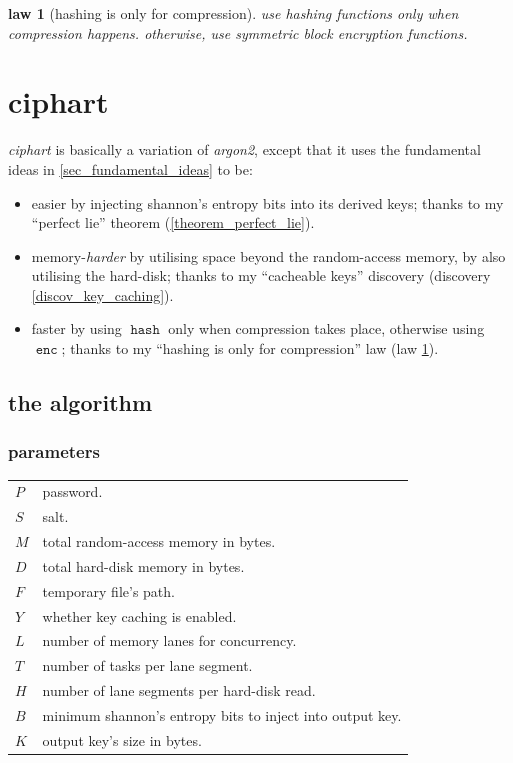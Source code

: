 \documentclass[twocolumn]{article}
\newtheorem{law}{law}[section]
\DeclareMathOperator{\enc}{\mathtt{enc}}
\DeclareMathOperator{\hash}{\mathtt{hash}}
\begin{document}
\begin{law}[hashing is only for compression]\label{law_simplification}
    use hashing functions only when compression happens.  otherwise, use
    symmetric block encryption functions.
\end{law}

\section{ciphart}
\emph{ciphart} is basically a variation of \emph{argon2}, except that it
uses the fundamental ideas in \cref{sec_fundamental_ideas} to be:
\begin{itemize}
    \item easier by injecting shannon's entropy bits into its derived keys;
    thanks to my ``perfect lie'' theorem (\cref{theorem_perfect_lie}).

    \item memory-\emph{harder} by utilising space beyond the random-access
    memory, by also utilising the hard-disk; thanks to my ``cacheable
    keys'' discovery (discovery \ref{discov_key_caching}).

    \item faster by using $\hash$ only when compression takes place,
    otherwise using $\enc$; thanks to my ``hashing is only for
    compression'' law (law \ref{law_simplification}).
\end{itemize}

\subsection{the algorithm}
\subsubsection{parameters}
\begin{tabularx}{\columnwidth}{lX}
    $P$ & password.\\
    $S$ & salt.\\
    $M$ & total random-access memory in bytes.\\
    $D$ & total hard-disk memory in bytes.\\
    $F$ & temporary file's path.\\
    $Y$ & whether key caching is enabled.\\
    $L$ & number of memory lanes for concurrency.\\
    $T$ & number of tasks per lane segment.\\
    $H$ & number of lane segments per hard-disk read.\\
    $B$ & minimum shannon's entropy bits to inject into output key.\\
    $K$ & output key's size in bytes.\\
\end{tabularx}
\end{document}
